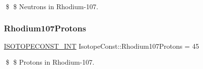 \$ \$ Neutrons in Rhodium-\/107. \mbox{\label{group___isotope_const-_rhodium-_rh107_gaa67159176cc77536dd72de75929ae1cd}} 
\subsubsection{\texorpdfstring{Rhodium107\+Protons}{Rhodium107Protons}}
{\footnotesize\ttfamily \mbox{\hyperlink{group___isotope_const-_macros_ga5f18360b3e99483a35c32d789e62621c}{I\+S\+O\+T\+O\+P\+E\+C\+O\+N\+S\+T\+\_\+\+I\+NT}} Isotope\+Const\+::\+Rhodium107\+Protons = 45}

\$ \$ Protons in Rhodium-\/107. 